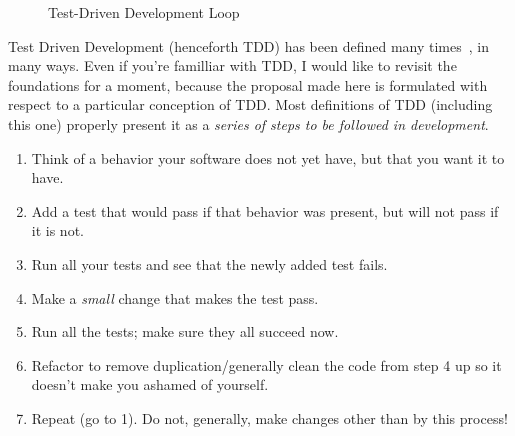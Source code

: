 \documentclass[sigplan,screen]{acmart}
\begin{document}
\begin{figure}[h!]
  \centering
  \caption{Test-Driven Development Loop}
  \label{fig:tdd}
\end{figure}

Test Driven Development (henceforth TDD) has been defined many times~\cite{beck2002test,astels2003test,TDDIBM,TDDAcademy},
in many ways.  Even if you're familliar with TDD, I would like to
revisit the foundations for a moment, because the proposal made here
is formulated with respect to a particular conception of TDD.  Most
definitions of TDD (including this one) properly present it as a
\emph{series of steps to be followed in development}.

\begin{enumerate}
  \item Think of a behavior your software does not yet have,
    but that you want it to have.
    \item Add a test that would pass if that behavior was present, but
      will not pass if it is not.
    \item Run all your tests and see that the newly added test fails.
    \item Make a \emph{small} change that makes the test pass.
    \item Run all the tests; make sure they all succeed now.
      \item Refactor to remove duplication/generally clean the code
        from step 4 up so it doesn't make you ashamed of yourself.
        \item Repeat (go to 1).  Do not, generally, make changes other than by
          this process!
      \end{enumerate}
\end{document}
